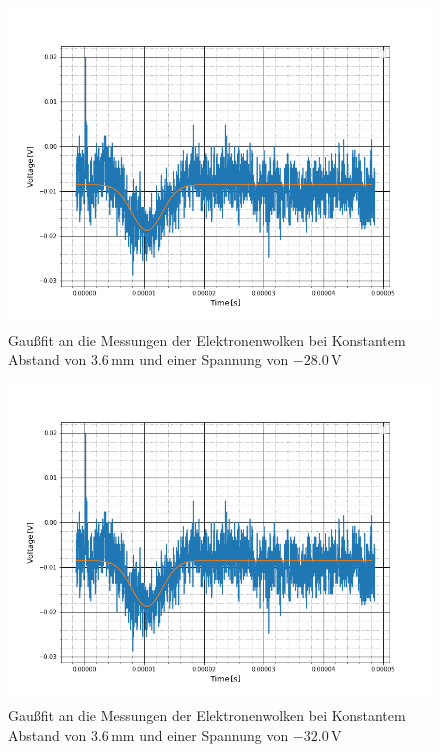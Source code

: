 \begin{figure}
	\includegraphics[scale=0.5]{Bild/A1}
	\centering
	\caption[Gaußfit an Messung bei Konst. Abstand]{Gaußfit an die Messungen der Elektronenwolken bei Konstantem Abstand von $3.6$\,mm und einer Spannung von $-28.0$\,V}
\end{figure}
\begin{figure}
	\includegraphics[scale=0.5]{Bild/A1}
	\centering
	\caption[Gaußfit an Messung bei Konst. Abstand]{Gaußfit an die Messungen der Elektronenwolken bei Konstantem Abstand von $3.6$\,mm und einer Spannung von $-32.0$\,V}
\end{figure}
